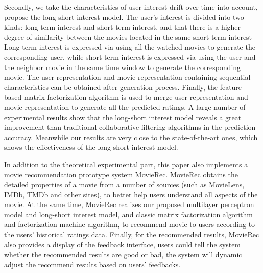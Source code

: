 \begin{eabstract}
Secondly, we take the characteristics of user interest drift over time into account,
propose the long short interest model. The user's interest is divided into two kinds: long-term interest and short-term interest,
and that there is a higher degree of similarity between the movies located in the same short-term interest
Long-term interest is expressed via using all the watched movies to generate the corresponding user,
while short-term interest is expressed via using the user and the neighbor movie
in the same time window to generate the corresponding movie.
The user representation and movie representation containing sequential characteristics can be obtained after generation process.
Finally, the feature-based matrix factorization algorithm is used to merge user representation
and movie representation to generate all the predicted ratings.
A large number of experimental results show that the long-short interest model reveals
a great improvement than traditional collaborative filtering algorithms in the prediction accuracy.
Meanwhile our results are very close to the state-of-the-art ones,
which shows the effectiveness of the long-short interest model.

In addition to the theoretical experimental part, this paper also implements a movie recommendation prototype system MovieRec. MovieRec obtains the detailed properties of a movie from a number of sources (such as MovieLens, IMDb, TMDb and other sites),
to better help users understand all aspects of the movie.
At the same time, MovieRec realizes our proposed multilayer perceptron model and long-short interest model,
and classic matrix factorization algorithm and factorization machine algorithm,
to recommend movie to users according to the users' historical ratings data.
Finally, for the recommended results, MovieRec also provides a display of the feedback interface,
users could tell the system whether the recommended results are good or bad,
the system will dynamic adjust the recommend results based on users' feedbacks.
\end{eabstract}


